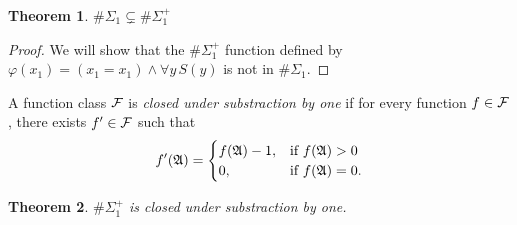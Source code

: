 \documentclass[12pt]{article}
\def\A{{\frak A}}
\def\F{{\cal F}}
\newtheorem{theo}{Theorem}
\begin{document}
\begin{theo}
$\#\Sigma_1 \subsetneq \#\Sigma_1^{+}$
\end{theo}
\begin{proof}
We will show that the $\#\Sigma_1^{+}$ function defined by $\varphi(x_1) = (x_1 = x_1) \wedge \forall y \, S(y)$ is not in $\#\Sigma_1$.
\end{proof}


A function class $\F$ is {\em closed under substraction by one} if for every function $f \in \F$, there exists $f' \in \F$ such that 
\begin{eqnarray*}
f'(\A) =
\begin{cases}
f(\A)-1, & \text{if }f(\A) > 0 \\
0, & \text{if }f(\A) = 0.
\end{cases}
\end{eqnarray*}
\begin{theo}
$\#\Sigma_1^+$ is closed under substraction by one.
\end{theo}
\end{document}
